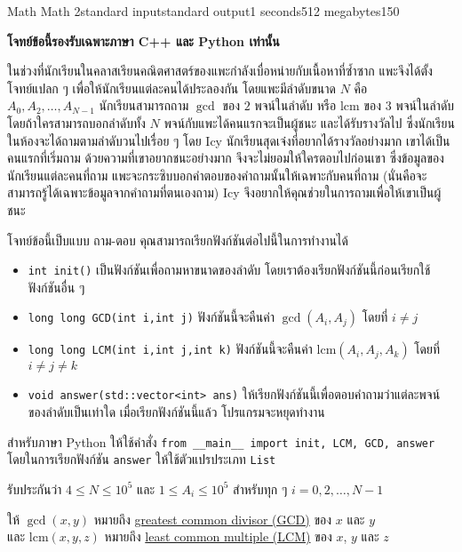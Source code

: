 \documentclass[11pt,a4paper]{article}
\begin{document}
\begin{problem}{Math Math 2}{standard input}{standard output}{1 seconds}{512 megabytes}{150}

\textbf{โจทย์ข้อนี้รองรับเฉพาะภาษา C++ และ Python เท่านั้น}


ในช่วงที่นักเรียนในคลาสเรียนคณิตศาสตร์ของแพะกำลังเบื่อหน่ายกับเนื้อหาที่ซ้ำซาก แพะจึงได้ตั้งโจทย์แปลก ๆ เพื่อให้นักเรียนแต่ละคนได้ประลองกัน โดยแพะมีลำดับขนาด $N$ คือ $A_0,A_2,\ldots,A_{N-1}$ นักเรียนสามารถถาม $\gcd$ ของ $2$ พจน์ในลำดับ หรือ $\mathrm{lcm}$ ของ $3$ พจน์ในลำดับ โดยถ้าใครสามารถบอกลำดับทั้ง $N$ พจน์กับแพะได้คนแรกจะเป็นผู้ชนะ และได้รับรางวัลไป ซึ่งนักเรียนในห้องจะได้ถามตามลำดับวนไปเรื่อย ๆ โดย Icy นักเรียนสุดเจ๋งที่อยากได้รางวัลอย่างมาก เขาได้เป็นคนแรกที่เริ่มถาม ด้วยความที่เขาอยากชนะอย่างมาก จึงจะไม่ยอมให้ใครตอบไปก่อนเขา ซึ่งข้อมูลของนักเรียนแต่ละคนที่ถาม แพะจะกระซิบบอกคำตอบของคำถามนั้นให้เฉพาะกับคนที่ถาม (นั่นคือจะสามารถรู้ได้เฉพาะข้อมูลจากคำถามที่ตนเองถาม) Icy จึงอยากให้คุณช่วยในการถามเพื่อให้เขาเป็นผู้ชนะ

โจทย์ข้อนี้เป็บแบบ ถาม-ตอบ คุณสามารถเรียกฟังก์ชันต่อไปนี้ในการทำงานได้

\begin{itemize}
    \item \verb|int init()| เป็นฟังก์ชันเพื่อถามหาขนาดของลำดับ โดยเราต้องเรียกฟังก์ชันนี้ก่อนเรียกใช้ฟังก์ชันอื่น ๆ
    \item \verb|long long GCD(int i,int j)| ฟังก์ชันนี้จะคืนค่า $\gcd(A_i,A_j)$ โดยที่ $i\neq j$
    \item \verb|long long LCM(int i,int j,int k)| ฟังก์ชันนี้จะคืนค่า $\mathrm{lcm}(A_i,A_j,A_k)$ โดยที่ $i\neq j\neq k$
    \item \verb|void answer(std::vector<int> ans)| ให้เรียกฟังก์ชันนี้เพื่อตอบคำถามว่าแต่ละพจน์ของลำดับเป็นเท่าใด เมื่อเรียกฟังก์ชันนี้แล้ว โปรแกรมจะหยุดทำงาน
\end{itemize}

สำหรับภาษา Python ให้ใช้คำสั่ง \verb|from __main__ import init, LCM, GCD, answer| โดยในการเรียกฟังก์ชัน \verb|answer| ให้ใช้ตัวแปรประเภท \verb|List|

รับประกันว่า $4\leq N\leq 10^5$ และ $1\leq A_i\leq 10^5$ สำหรับทุก ๆ $i=0,2,\ldots,N-1$

ให้ $\gcd(x,y)$ หมายถึง \textcolor{blue}{\href{https://en.wikipedia.org/wiki/Greatest_common_divisor}{greatest common divisor (GCD)}} ของ $x$ และ $y$ \\
และ $\mathrm{lcm}(x,y,z)$ หมายถึง \textcolor{blue}{\href{https://en.wikipedia.org/wiki/Least_common_multiple}{least common multiple (LCM)}} ของ $x$, $y$ และ $z$


\end{problem}
\end{document}
